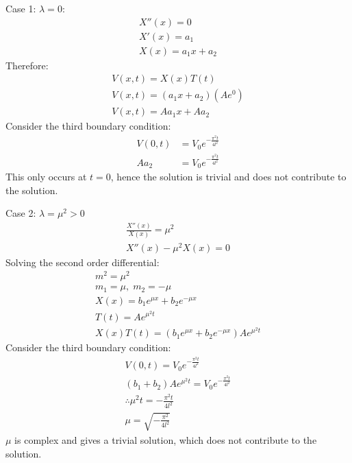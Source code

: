 \documentclass[11pt]{article}
\numberwithin{equation}{section}
\begin{document}
Case 1: $\lambda = 0$:
\begin{gather}
    X''(x) = 0\\
    X'(x) = a_1\\
    X(x) = a_1 x + a_2
\end{gather}
Therefore:
\begin{gather}
    V(x,t) = X(x)T(t)\\
    V(x,t) = \left(a_1 x + a_2\right)\left(Ae^0\right)\\
    V(x,t) = A a_1 x + Aa_2 
\end{gather}
Consider the third boundary condition:
\begin{align}
    V(0,t) &= V_0 e^{-\frac{\pi^2 t}{4l^2}}\\
    Aa_2 &= V_0 e^{-\frac{\pi^2 t}{4l^2}}
\end{align}
This only occurs at $t = 0$, hence the solution is trivial and does not contribute to the solution.

Case 2: $\lambda = \mu^2 > 0$
\begin{gather}
    \frac{X''(x)}{X(x)} = \mu^2\\
    X''(x) - \mu^2 X(x) = 0
\end{gather}
Solving the second order differential:
\begin{gather}
    m^2 = \mu^2\\
    m_1 = \mu, \; m_2 = - \mu\\
    X(x) = b_1 e^{\mu x } + b_2 e^{-\mu x}\\
    T(t) = Ae^{\mu^2 t}\\
    X(x)T(t) = \left(b_1 e^{\mu x } + b_2 e^{-\mu x}\right)Ae^{\mu^2 t}
\end{gather}
Consider the third boundary condition:
\begin{gather}
    V(0,t) = V_0 e^{-\frac{\pi^2 t}{4l^2}}\\
    \left(b_1 + b_2\right)Ae^{\mu^2 t} = V_0 e^{-\frac{\pi^2 t}{4l^2}}\\
    \therefore \mu^2 t = -\frac{\pi^2 t }{4l^2}\\
    \mu = \sqrt{-\frac{\pi^2 }{4l^2}}
\end{gather}
$\mu$ is complex and gives a trivial solution, which does not contribute to the solution.
\end{document}
